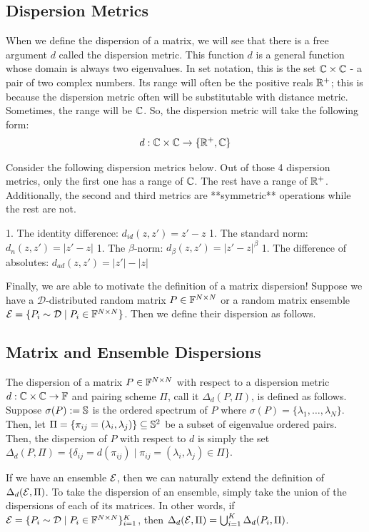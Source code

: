 \subsection{Dispersion Metrics}

When we define the dispersion of a matrix, we will see that there is a free argument $d$ called the dispersion metric. This function $d$ is a general function whose domain is always two eigenvalues. In set notation, this is the set $\Cc \times \Cc$ - a pair of two complex numbers. Its range will often be the positive reals $\R^+$; this is because the dispersion metric often will be substitutable with distance metric. Sometimes, the range will be $\Cc$. So, the dispersion metric will take the following form:
\begin{align*}
d: \Cc \times \Cc \to \{\R^+, \Cc\}
\end{align*}

Consider the following dispersion metrics below. Out of those 4 dispersion metrics, only the first one has a range of $\Cc$. The rest have a range of $\R^+$. Additionally, the second and third metrics are **symmetric** operations while the rest are not.

1. The identity difference: $d_{id}(z,z') = z' - z$
1. The standard norm: $d_{n}(z,z') = |z' - z|$
1. The $\beta$-norm: $d_\beta(z,z') = |z' - z|^\beta$
1. The difference of absolutes: $d_{ad}(z,z') = |z'| - |z|$

Finally, we are able to motivate the definition of a matrix dispersion! Suppose we have a $\mathcal{D}$-distributed random matrix $P \in \F^{N \times N}$ or a random matrix ensemble $\Ens = \{P_i \sim \mathcal{D} \mid P_i \in \F^{N \times N}\}$. Then we define their dispersion as follows. 

\subsection{Matrix and Ensemble Dispersions}

\begin{definition}[Dispersion]
The dispersion of a matrix $P \in \F^{N \times N}$ with respect to a dispersion metric $d: \Cc \times \Cc \to \F$ and pairing scheme $\Pi$, call it $\Delta_d(P, \Pi)$, is defined as follows. Suppose $\sigma(P) := \S$ is the ordered spectrum of $P$ where $\sigma(P) = \{\lambda_1, \dots, \lambda_N\}$. Then, let $\Pi = \{\pi_{ij} = (\lambda_i,\lambda_j) \} \subseteq \S^2$ be a subset of eigenvalue ordered pairs. Then, the dispersion of $P$ with respect to $d$ is simply the set $\Delta_d(P, \Pi)=\{\delta_{ij} = d(\pi_{ij}) \mid \pi_{ij} = (\lambda_i,\lambda_j) \in \Pi\}$.
\end{definition}

\begin{definition}
If we have an ensemble $\Ens$, then we can naturally extend the definition of $\Delta_d(\Ens, \Pi)$. To take the dispersion of an ensemble, simply take the union of the dispersions of each of its matrices. In other words, if $\Ens = \{P_i \sim \mathcal{D} \mid P_i \in \F^{N \times N}\}_{i = 1}^K$, then $\Delta_d(\Ens, \Pi) = \bigcup_{i=1}^K \Delta_d(P_i, \Pi)$.
\end{definition}